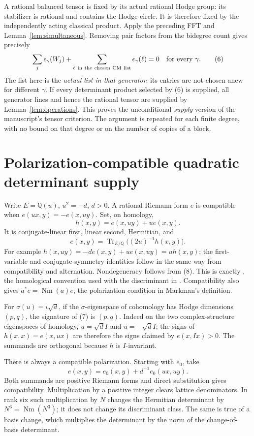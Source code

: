 \documentclass[11pt]{article}
\newcommand{\Q}{\mathbb Q}
\DeclareMathOperator{\Nm}{Nm}
\DeclareMathOperator{\Tr}{Tr}
\theoremstyle{remark}
\begin{document}
A rational balanced tensor is fixed by its actual rational Hodge group:
its stabilizer is rational and contains the Hodge circle. It is therefore
fixed by the independently acting classical product. Apply the preceding
FFT and Lemma~\ref{lem:simultaneous}. Removing pair factors from the
bidegree count gives precisely
\[
 \sum_j\epsilon_\gamma(W_j)+
 \sum_{\ell\ {\rm in\ the\ chosen\ CM\ list}}\epsilon_\gamma(\ell)=0
       \quad\hbox{for every }\gamma.
 \tag{6}\label{eq:balance}
\]
The list here is the \emph{actual list in that generator}; its entries
are not chosen anew for different $\gamma$.
If every determinant product selected by (6) is supplied, all generator
lines and hence the rational tensor are supplied by
Lemma~\ref{lem:operations}. This proves the unconditional
\emph{supply} version of the manuscript's tensor criterion.
The argument is repeated for each finite degree, with no bound on that
degree or on the number of copies of a block.

\section{Polarization-compatible quadratic determinant supply}

Write $E=\Q(u)$, $u^2=-d$, $d>0$. A rational Riemann form $e$ is
compatible when $e(ux,y)=-e(x,uy)$. Set, on homology,
\[
 h(x,y)=e(x,uy)+u e(x,y).
 \tag{7}\label{eq:hermitian}
\]
It is conjugate-linear first, linear second, Hermitian, and
\[
 e(x,y)=\Tr_{E/\Q}\bigl((2u)^{-1}h(x,y)\bigr).
 \tag{8}\label{eq:trace}
\]
For example $h(x,uy)=-de(x,y)+u e(x,uy)=u h(x,y)$;
the first-variable and conjugate-symmetry identities follow in the
same way from compatibility and alternation. Nondegeneracy follows
from (8). This is exactly \cite[Lemma 5.2]{vG}, the homological
convention used with the discriminant in \cite[Section 1.1]{Markman}.
Compatibility also gives $a^*e=\Nm(a)e$, the polarization condition
in Markman's definition.

For $\sigma(u)=i\sqrt d$, if the $\sigma$-eigenspace of cohomology has
Hodge dimensions $(p,q)$, the signature of (7) is $(p,q)$.
Indeed on the two complex-structure eigenspaces of homology,
$u=\sqrt d I$ and $u=-\sqrt d I$; the signs of $h(x,x)=e(x,ux)$
are therefore the signs claimed by $e(x,Ix)>0$. The summands are
orthogonal because $h$ is $I$-invariant.

There is always a compatible polarization. Starting with $e_0$, take
\[
 e(x,y)=e_0(x,y)+d^{-1}e_0(ux,uy).
 \tag{9}\label{eq:average}
\]
Both summands are positive Riemann forms and direct substitution gives
compatibility. Multiplication by a positive integer clears lattice
denominators. In rank six such multiplication by $N$ changes the
Hermitian determinant by $N^6=\Nm(N^3)$; it does not change its
discriminant class. The same is true of a basis change, which multiplies
the determinant by the norm of the change-of-basis determinant.
\end{document}
